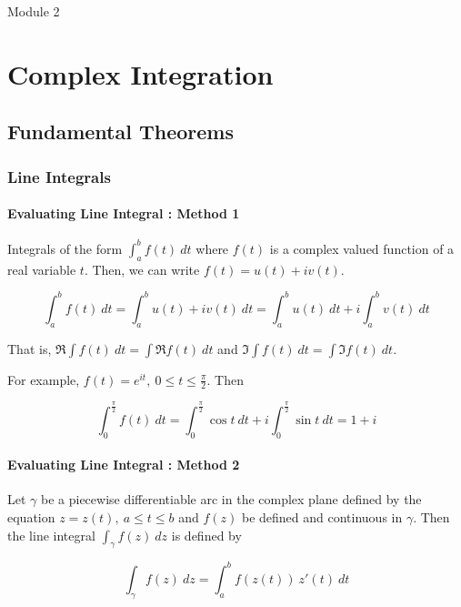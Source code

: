 



{\Large Module 2 }
\section{Complex Integration}
\subsection{Fundamental Theorems}
\subsubsection{Line Integrals}
\paragraph{Evaluating Line Integral : Method 1}
	Integrals of the form $\int_a^b f(t)\ dt$ where $f(t)$ is a complex valued function of a real variable $t$.
	Then, we can write $f(t) = u(t)+iv(t)$.

\[ \int_a^b f(t)\ dt = \int_a^b u(t) + iv(t)\ dt = \int_a^b u(t)\ dt + i\int_a^b v(t)\ dt \]

	That is, $\Re\int f(t)\ dt = \int \Re f(t)\ dt$ and $\Im\int f(t)\ dt = \int \Im f(t)\ dt$.

	For example, $f(t) = e^{it},\ 0 \le t \le \frac{\pi}{2}$.
	Then 

\[ \int_0^{\frac{\pi}{2}} f(t)\ dt = \int_0^{\frac{\pi}{2}} \cos t\ dt + i \int_0^{\frac{\pi}{2}} \sin t\ dt = 1 + i \]

\paragraph{Evaluating Line Integral : Method 2}
	Let $\gamma$ be a piecewise differentiable arc in the complex plane defined by the equation $z = z(t),\ a \le t \le b$ and $f(z)$ be defined and continuous in $\gamma$.
	Then the line integral $\int_\gamma f(z)\ dz$ is defined by

\[ \int_\gamma f(z)\ dz = \int_a^b f(z(t))\ z'(t)\ dt \]

